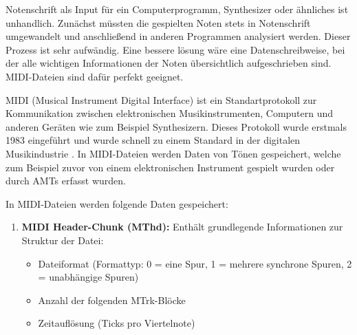 \begin{description}[style=nextline]
\item[MIDI-Dateien]\label{itm:midi}
Notenschrift als Input für ein Computerprogramm, Synthesizer oder ähnliches ist unhandlich.
Zunächst müssten die gespielten Noten stets in Notenschrift umgewandelt und anschließend in anderen Programmen analysiert werden.
Dieser Prozess ist sehr aufwändig.
Eine bessere lösung wäre eine Datenschreibweise,
bei der alle wichtigen Informationen der Noten übersichtlich aufgeschrieben sind.
MIDI-Dateien sind dafür perfekt geeignet.

MIDI (Musical Instrument Digital Interface) ist ein Standartprotokoll zur Kommunikation zwischen
elektronischen Musikinstrumenten, Computern und anderen Geräten wie zum Beispiel Synthesizern.
Dieses Protokoll wurde erstmals 1983 eingeführt und wurde schnell zu einem Standard in der digitalen Musikindustrie \cite{smith1983midi}.
In MIDI-Dateien werden Daten von Tönen gespeichert,
welche zum Beispiel zuvor von einem elektronischen Instrument gespielt wurden oder durch AMTs erfasst wurden.

In MIDI-Dateien werden folgende Daten gespeichert:
\begin{enumerate}
    \item \textbf{MIDI Header-Chunk (MThd):} Enthält grundlegende Informationen zur Struktur der Datei:
    \begin{itemize}
        \item Dateiformat (Formattyp: 0 = eine Spur, 1 = mehrere synchrone Spuren, 2 = unabhängige Spuren)
        \item Anzahl der folgenden MTrk-Blöcke
        \item Zeitauflösung (Ticks pro Viertelnote)
    \end{itemize}


\end{enumerate}
\end{description}
